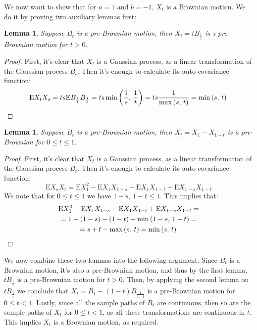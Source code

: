 \documentclass{amsart}
\theoremstyle{plain}
\newtheorem{lemma}[theorem]{Lemma}
\theoremstyle{definition}
\theoremstyle{definition}
\theoremstyle{remark}
\begin{document}
We now want to show that for \(a=1\) and \(b=-1\), \(X_{t}\) is a Brownian motion. We do it by proving two auxiliary lemmas first:
\begin{lemma}
    Suppose \(B_{t}\) is a pre-Brownian motion, then \(X_{t}=tB_{\frac{1}{t}}\) is s pre-Brownian motion for \(t>0\).
\end{lemma}
\begin{proof}
   First, it's clear that \(X_{t}\) is a Gaussian process, as a linear transformation of the Gaussian process \(B_{t}\). Then it's enough to calculate its auto-covariance function:
   \begin{equation*}
       \mathrm{E}X_{t}X_{s} = ts \mathrm{E}B_{\frac{1}{t}}B_{\frac{1}{s}}=ts \min\left( \frac{1}{s},\,\frac{1}{t} \right) = ts \frac{1}{\max \left(s,\,t\right)} = \min \left(s,\,t\right)
       \qedhere
   \end{equation*}
\end{proof}
\begin{lemma}
    Suppose \(B_{t}\) is a pre-Brownian motion, then \(X_{t} = X_{1} - X_{1-t}\) is a pre-Brownian for \(0\leq t \leq 1\).
\end{lemma}
\begin{proof}
   First, it's clear that \(X_{t}\) is a Gaussian process, as a linear transformation of the Gaussian process \(B_{t}\). Then it's enough to calculate its auto-covariance function:
   \begin{equation*}
       \mathrm{E}X_{s}X_{t} = \mathrm{E}X_{1}^{2} -\mathrm{E}X_{1}X_{1-s} - \mathrm{E}X_{1}X_{1-t} + \mathrm{E}X_{1-s}X_{1-t}
   \end{equation*}
   We note that for \(0\leq t\leq 1\) we have \(1-s,\,1-t \leq 1\). This implies that:
  \begin{gather*}
      \mathrm{E}X_{1}^{2} -\mathrm{E}X_{1}X_{1-s} - \mathrm{E}X_{1}X_{1-t} + \mathrm{E}X_{1-s}X_{1-t} = \\ = 1 - \left(1-s\right) - \left(1-t\right) + \min \left(1-s,\,1-t\right) = \\ =  s + t - \max \left(s,\,t\right) = \min \left(s,\,t\right)
      \qedhere
  \end{gather*}
\end{proof}

We now combine these two lemmas into the following argument: Since \(B_{t}\) is a Brownian motion, it's also a pre-Brownian motion, and thus by the first lemma, \(tB_{\frac{1}{t}}\) is a pre-Brownian motion for \(t > 0\). Then, by applying the second lemma on \(tB_{\frac{1}{t}}\) we conclude that \(X_{t} = B_{1}-\left(1-t\right)B_{\frac{1}{1-t}}\) is a pre-Brownian motion for \(0 \leq t < 1\). Lastly, since all the sample paths of \(B_{t}\) are continuous,
then so are the sample paths of \(X_{t}\) for \(0 \leq t < 1\), as all these transformations are continuous in \(t\). This implies \(X_{t}\) is a Brownian motion, as required.
\end{document}

